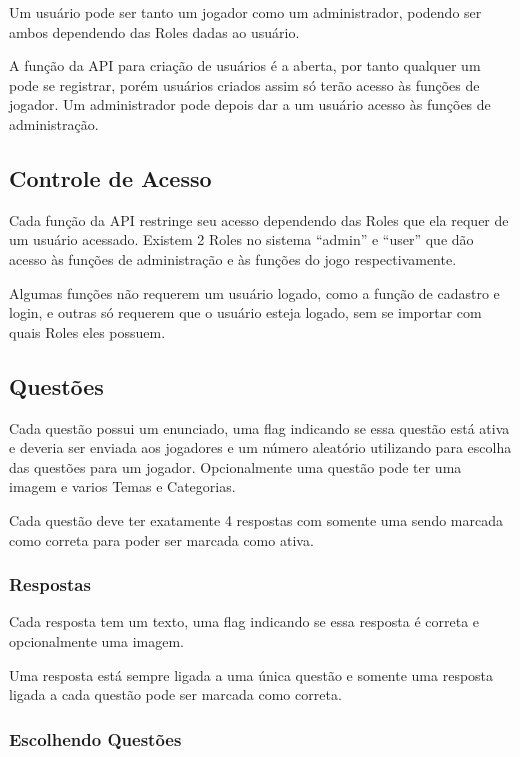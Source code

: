 Um usuário pode ser tanto um jogador como um administrador, podendo ser ambos dependendo das Roles dadas ao usuário. 

A função da API para criação de usuários é a aberta, por tanto qualquer um pode se registrar, porém usuários criados assim só terão acesso às funções de jogador. Um administrador pode depois dar a um usuário acesso às funções de administração.

\subsection{Controle de Acesso}
\label{subsec:acesso}

Cada função da API restringe seu acesso dependendo das Roles que ela requer de um usuário acessado. Existem 2 Roles no sistema “admin” e “user” que dão acesso às funções de administração e às funções do jogo respectivamente.

Algumas funções não requerem um usuário logado, como a função de cadastro e login, e outras só requerem que o usuário esteja logado, sem se importar com quais Roles eles possuem.

\subsection{Questões}
\label{subsec:questoes}

Cada questão possui um enunciado, uma flag indicando se essa questão está ativa e deveria ser enviada aos jogadores e um número aleatório utilizando para escolha das questões para um jogador. Opcionalmente uma questão pode ter uma imagem e varios Temas e Categorias. 

Cada questão deve ter exatamente 4 respostas com somente uma sendo marcada como correta para poder ser marcada como ativa. 

\subsubsection{Respostas}
\label{subsubsec:respostas}

Cada resposta tem um texto, uma flag indicando se essa resposta é correta e opcionalmente uma imagem. 

Uma resposta está sempre ligada a uma única questão e somente uma resposta ligada a cada questão pode ser marcada como correta. 


\subsubsection{Escolhendo Questões}
\label{subsubsec:escolhendo}

